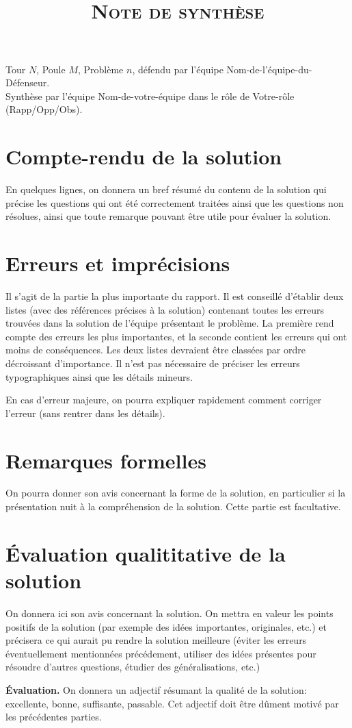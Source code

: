 \documentclass[a4paper,11pt]{article}
\title{
\Huge \textsc{
\tfjm \\
\LARGE Note de synthèse}}
\date{}
\begin{document}
\maketitle
\thispagestyle{empty}

\vspace{-1cm}
Tour $N$, Poule $M$, Problème $n$, d\'efendu par l'\'equipe {\sc Nom-de-l'\'equipe-du-D\'efenseur}.\\

Synth\`ese par l'\'equipe {\sc Nom-de-votre-\'equipe} dans le r\^ole de {\sc Votre-r\^ole (Rapp/Opp/Obs)}.

\section*{Compte-rendu de la solution}

En quelques lignes, on donnera un bref résumé du contenu de la solution qui précise les questions qui ont été correctement traitées ainsi que les questions non résolues, ainsi que toute remarque pouvant être utile pour évaluer la solution.

\section*{Erreurs et imprécisions}

Il s'agit de la partie la plus importante du rapport. Il est conseillé d'établir deux listes (avec des références précises à la solution) contenant toutes les erreurs trouvées dans la solution de l'équipe présentant le problème. La première rend compte des erreurs les plus importantes, et la seconde contient les erreurs qui ont moins de conséquences. Les deux listes devraient être classées par ordre décroissant d'importance. Il n'est pas nécessaire de préciser les erreurs typographiques ainsi que les détails mineurs.

En cas d'erreur majeure, on pourra expliquer rapidement comment corriger l'erreur (sans rentrer dans les détails).


\section*{Remarques formelles}

On pourra donner son avis concernant la forme de la solution, en particulier si la présentation nuit à la compréhension de la solution. Cette partie est facultative.


\section*{\'Evaluation qualititative de la solution}

On donnera ici son avis concernant la solution. On mettra en valeur les points positifs de la solution (par exemple des idées importantes, originales, etc.) et précisera ce qui aurait pu rendre la solution meilleure (éviter les erreurs éventuellement mentionnées précédement, utiliser des idées présentes pour résoudre d'autres questions, étudier des généralisations, etc.)


\textbf{\'Evaluation.} On donnera un adjectif résumant la qualité de la solution: excellente, bonne, suffisante, passable. Cet adjectif doit être dûment motivé par les précédentes parties.
\end{document}
